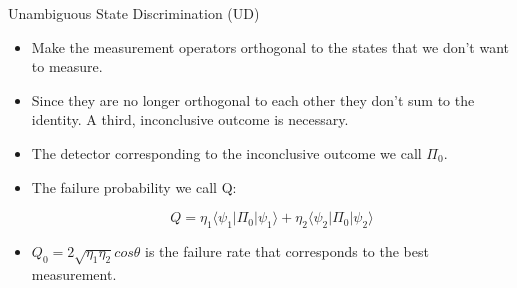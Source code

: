\documentclass{beamer}
\newcommand{\br}[1]{\langle #1|}
\newcommand{\ke}[1]{|#1\rangle}
\begin{document}
\begin{frame}{Unambiguous State Discrimination (UD)}



\begin{itemize}
\item
	Make the measurement operators orthogonal to the states that we don't want to measure.

\item
	Since they are no longer orthogonal to each other they don't sum to the identity. A third, inconclusive outcome is necessary.
\item
	The detector corresponding to the inconclusive outcome we call $\Pi_0$.

\item
	The failure probability we call Q:

\[Q =  \eta_1 \br {\psi_1} \Pi_0\ke {\psi_1} + \eta_2 \br {\psi_2} \Pi_0\ke {\psi_2}\]

\item
$ Q_0 = 2 \sqrt{\eta_1\eta_2} cos \theta$  is the failure rate that corresponds to the best measurement.
\end{itemize}

\end{frame}
\end{document}
